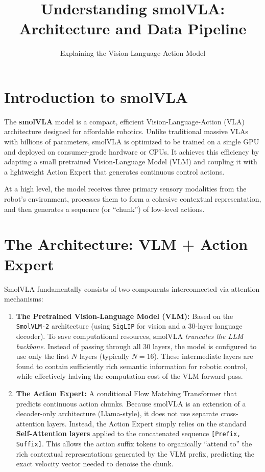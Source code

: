 \documentclass[11pt,a4paper]{article}
\title{\textbf{Understanding smolVLA: Architecture and Data Pipeline}}
\author{Explaining the Vision-Language-Action Model}
\date{\vspace{-5ex}}
\begin{document}
\maketitle

\section{Introduction to smolVLA}
The \textbf{smolVLA} model is a compact, efficient Vision-Language-Action (VLA) architecture designed for affordable robotics. Unlike traditional massive VLAs with billions of parameters, smolVLA is optimized to be trained on a single GPU and deployed on consumer-grade hardware or CPUs. It achieves this efficiency by adapting a small pretrained Vision-Language Model (VLM) and coupling it with a lightweight Action Expert that generates continuous control actions.

At a high level, the model receives three primary sensory modalities from the robot's environment, processes them to form a cohesive contextual representation, and then generates a sequence (or ``chunk'') of low-level actions.

\section{The Architecture: VLM + Action Expert}
SmolVLA fundamentally consists of two components interconnected via attention mechanisms:

\begin{enumerate}
    \item \textbf{The Pretrained Vision-Language Model (VLM):} Based on the \texttt{SmolVLM-2} architecture (using \texttt{SigLIP} for vision and a 30-layer language decoder). To save computational resources, smolVLA \textit{truncates the LLM backbone}. Instead of passing through all 30 layers, the model is configured to use only the first $N$ layers (typically $N=16$). These intermediate layers are found to contain sufficiently rich semantic information for robotic control, while effectively halving the computation cost of the VLM forward pass.
    
    \item \textbf{The Action Expert:} A conditional Flow Matching Transformer that predicts continuous action chunks. Because smolVLA is an extension of a decoder-only architecture (Llama-style), it does not use separate cross-attention layers. Instead, the Action Expert simply relies on the standard \textbf{Self-Attention layers} applied to the concatenated sequence \texttt{[Prefix, Suffix]}. This allows the action suffix tokens to organically ``attend to'' the rich contextual representations generated by the VLM prefix, predicting the exact velocity vector needed to denoise the chunk.
\end{enumerate}
\end{document}
